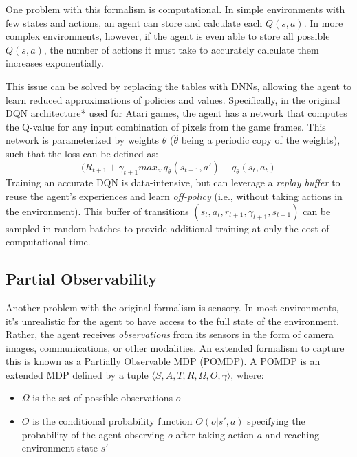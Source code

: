 \documentclass[letterpaper]{article}
\begin{document}
 	One problem with this formalism is computational. In simple environments with few states and actions, an agent can store and calculate each $Q(s,a)$. In more complex environments, however, if the agent is even able to store all possible $Q(s,a)$, the number of actions it must take to accurately calculate them increases exponentially.
 	
 	This issue can be solved by replacing the tables with DNNs, allowing the agent to learn reduced approximations of policies and values. Specifically, in the original DQN architecture* used for Atari games, the agent has a network that computes the Q-value for any input combination of pixels from the game frames. This network is parameterized by weights $\theta$ ($\widehat{\theta}$ being a periodic copy of the weights), such that the loss can be defined as:
 	\begin{equation}
	 	(R_{t+1}+\gamma_{t+1}max_{a'}q_{\widehat{\theta}}(s_{t+1}, a')-q_{\theta}(s_t, a_t)
 	\end{equation}
 	Training an accurate DQN is data-intensive, but can leverage a \textit{replay buffer} to reuse the agent's experiences and learn \textit{off-policy} (i.e., without taking actions in the environment). This buffer of transitions $(s_t, a_t, r_{t+1}, \gamma_{t+1}, s_{t+1})$ can be sampled in random batches to provide additional training at only the cost of computational time.
 	
 	\subsection{Partial Observability}
 	
 	Another problem with the original formalism is sensory. In most environments, it's unrealistic for the agent to have access to the full state of the environment. Rather, the agent receives \textit{observations} from its sensors in the form of camera images, communications, or other modalities. An extended formalism to capture this is known as a Partially Observable MDP (POMDP). A POMDP is an extended MDP defined by a tuple $\langle S, A, T, R, \Omega, O, \gamma \rangle$, where:
 	\begin{itemize}
 		\item $\Omega$ is the set of possible observations $o$
 		\item $O$ is the conditional probability function $O(o|s',a)$ specifying the probability of the agent observing $o$ after taking action $a$ and reaching environment state $s'$
 	\end{itemize}
 
\end{document}
